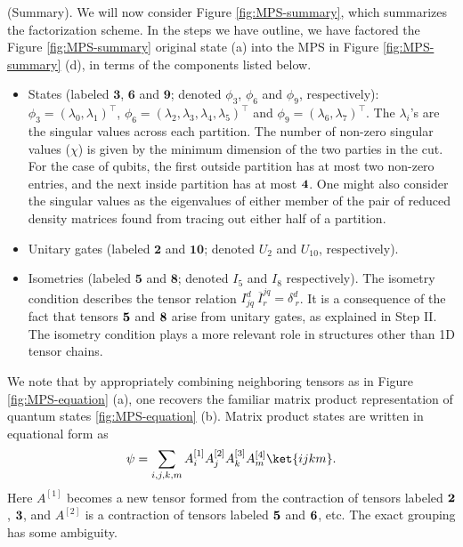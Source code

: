 (Summary). We will now consider Figure \ref{fig:MPS-summary}, which summarizes the factorization scheme. In the steps we have outline, we have factored the Figure \ref{fig:MPS-summary} original state (a) into the MPS in Figure \ref{fig:MPS-summary} (d), in terms of the components listed below.  

\begin{itemize}
 \item[(i)] States (labeled $\textbf{3}$, $\textbf{6}$ and $\textbf{9}$; denoted $\phi_3$, $\phi_6$ and $\phi_9$, respectively): $\phi_3=(\lambda_0,\lambda_1)^\top$, $\phi_6=(\lambda_2,\lambda_3,\lambda_4,\lambda_5)^\top$ and $\phi_9=(\lambda_6,\lambda_7)^\top$.  The $\lambda_i$'s are the singular values across each partition.  The number of non-zero singular values ($\chi$) is given by the minimum dimension of the two parties in the cut.  For the case of qubits, the first outside partition has at most two non-zero entries, and the next inside partition has at most ${\bf 4}$.   One might also consider the singular values as the eigenvalues of either member of the pair of reduced density matrices found from tracing out either half of a partition.  
 \item[(ii)] Unitary gates (labeled $\textbf{2}$ and $\textbf{10}$; denoted $U_2$ and $U_{10}$, respectively).  
 \item[(iii)] Isometries (labeled $\textbf{5}$ and $\textbf{8}$; denoted $I_5$ and $I_8$ respectively).   The isometry condition describes the tensor relation $I_{jq}^d ~\overline{I}^{jq}_r = \delta ^d_{~r}$.  It is a consequence of the fact that tensors ${\bf 5}$ and ${\bf 8}$ arise from unitary gates, as explained in Step II.  The isometry condition plays a more relevant role in structures other than 1D tensor chains.   
\end{itemize}

We note that by appropriately combining neighboring tensors as in Figure \ref{fig:MPS-equation} (a), one recovers the familiar matrix product representation of quantum states \ref{fig:MPS-equation} (b).  Matrix product states are written in equational form as  
\begin{equation}\label{eqn:MPS}
 \psi = \sum_{i,j,k,m} A^{[1]}_i A^{[2]}_j A^{[3]}_k A^{[4]}_m\ket{ijkm}.
\end{equation}
Here $A^{[1]}$ becomes a new tensor formed from the contraction of tensors labeled ${\bf 2}$, ${\bf 3}$, and $A^{[2]}$ is a contraction of tensors labeled ${\bf 5}$ and ${\bf 6}$, etc. The exact grouping has some ambiguity.  


